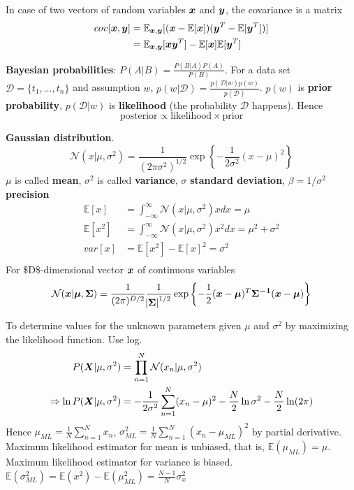 \documentclass[11pt]{article}
\begin{document}
In case of two vectors of random variables \(\boldsymbol{x}\) and \(\boldsymbol{y}\), the
covariance is a matrix
\begin{align*}
cov[\boldsymbol{x},\boldsymbol{y}]&=\mathbb{E}_{\boldsymbol{x},\boldsymbol{y}}[(\boldsymbol{x}-\mathbb{E}[\boldsymbol{x}])(\boldsymbol{y}^T
-\mathbb{E}[\boldsymbol{y}^T])]\\
&=\mathbb{E}_{\boldsymbol{x},\boldsymbol{y}}[\boldsymbol{xy}^T]-\mathbb{E}[\boldsymbol{x}]\mathbb{E}[\boldsymbol{y}^T]
\end{align*}

\textbf{Bayesian probabilities}: \(P(A|B)=\frac{P(B|A)P(A)}{P(B)}\). For a data set 
\(\mathcal{D}=\{t_1,\dots,t_n\}\) and assumption \(w\),
\(p(w|\mathcal{D})=\frac{p(\mathcal{D}|w)p(w)}{p(\mathcal{D})}\). \(p(w)\) is
\textbf{prior probability}, \(p(\mathcal{D}|w)\) is \textbf{likelihood} (the probability
\(\mathcal{D}\) happens). Hence 
\begin{equation*}
\text{posterior}\propto\text{likelihood}\times\text{prior}
\end{equation*}

\textbf{Gaussian distribution}.
\begin{equation*}
\mathcal{N}(x|\mu,\sigma^2)=\frac{1}{(2\pi\sigma^2)^{1/2}}\exp\left\{
-\frac{1}{2\sigma^2}(x-\mu)^2\right\}
\end{equation*}
\(\mu\) is called \textbf{mean}, \(\sigma^2\) is called \textbf{variance}, \(\sigma\) \textbf{standard
deviation}, \(\beta=1/\sigma^2\) \textbf{precision}
\begin{align*}
\mathbb{E}[x]&=\int_{-\infty}^\infty\mathcal{N}(x|\mu,\sigma^2)xdx=\mu\\
\mathbb{E}[x^2]&=\int_{-\infty}^\infty\mathcal{N}(x|\mu,\sigma^2)x^2dx=\mu^2
+\sigma^2\\
var[x]&=\mathbb{E}[x^2]-\mathbb{E}[x]^2=\sigma^2\\
\end{align*}
For \$D\$-dimensional vector \(\boldsymbol{x}\) of continuous variables
\begin{equation*}
\mathcal{N}(\boldsymbol{x}|\boldsymbol{\mu},\boldsymbol{\Sigma})=\frac{1}{(2\pi)^{D/2}}\frac{1}
{\abs{\boldsymbol{\Sigma}}^{1/2}}\exp\left\{-\frac{1}{2}(\boldsymbol{x}-\boldsymbol{\mu})^T
\boldsymbol{\Sigma^{-1}}(\boldsymbol{x}-\boldsymbol{\mu})\right\}
\end{equation*}

To determine values for the unknown parameters given \(\mu\) and \(\sigma^2\) by
maximizing the likelihood function. Use log.
\begin{align*}
P(\boldsymbol{X}|\mu,\sigma^2)&=\displaystyle\prod_{n=1}^N\mathcal{N}(x_n|\mu,\sigma^2)\\
\Rightarrow \ln P(\boldsymbol{X}|\mu,\sigma^2)&=-\frac{1}{2\sigma^2}
\displaystyle\sum_{n=1}^N(x_n-\mu)^2-\frac{N}{2}\ln\sigma^2-\frac{N}{2}\ln(2\pi)\\
\end{align*}
Hence \(\mu_{ML}=\frac{1}{N}\displaystyle\sum_{n=1}^Nx_n\),
\(\sigma^2_{ML}=\frac{1}{N}\displaystyle\sum_{n=1}^N(x_n-\mu_{ML})^2\) by
partial derivative. Maximum likelihood estimator for mean is unbiased, that
is, \(\mathbb{E}(\mu_{ML})=\mu\). Maximum likelihood estimator for variance is
biased. \(\mathbb{E}(\sigma_{ML}^2)=\mathbb{E}(x^2)-\mathbb{E}(\mu_{ML}^2)=
   \frac{N-1}{N}\sigma_x^2\)
\end{document}
